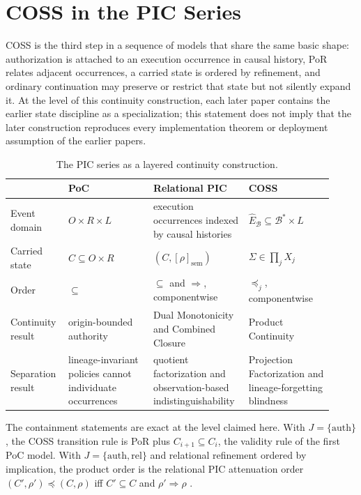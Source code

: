 \documentclass[10pt,twocolumn]{article}
\newcommand{\Model}{\textnormal{\textsc{COSS}}\xspace}
\newcommand{\state}{\Sigma}
\begin{document}
\section{COSS in the PIC Series}
\label{sec:series}

\Model is the third step in a sequence of models that share the same basic
shape: authorization is attached to an execution occurrence in causal history,
PoR relates adjacent occurrences, a carried state is ordered by refinement, and
ordinary continuation may preserve or restrict that state but not silently
expand it.  At the level of this continuity construction, each later paper
contains the earlier state discipline as a specialization; this statement does
not imply that the later construction reproduces every implementation theorem
or deployment assumption of the earlier papers.

\begin{table}[t]
\centering
\small
\begin{tabular}{@{}p{0.15\linewidth}p{0.255\linewidth}p{0.255\linewidth}p{0.255\linewidth}@{}}
\toprule
 & PoC \cite{gallo_poc2026} & Relational PIC \cite{gallo_relational2026} & \Model \\
\midrule
Event domain & $O\times R\times L$ & execution occurrences indexed by causal histories & $\widehat E_{\mathcal B}\subseteq\mathcal{B}^*\times L$ \\
Carried state & $C\subseteq O\times R$ & $(C,[\rho]_{\mathrm{sem}})$ & $\state\in\prod_j X_j$ \\
Order & $\subseteq$ & $\subseteq$ and $\Rightarrow$, componentwise & $\preceq_j$, componentwise \\
Continuity result & origin-bounded authority & Dual Monotonicity and Combined Closure & Product Continuity \\
Separation result & lineage-invariant policies cannot individuate occurrences & quotient factorization and observation-based indistinguishability & Projection Factorization and lineage-forgetting blindness \\
\bottomrule
\end{tabular}
\caption{The PIC series as a layered continuity construction.}
\label{tab:series}
\end{table}

The containment statements are exact at the level claimed here.  With
$J=\{\mathrm{auth}\}$, the \Model transition rule is PoR plus
$C_{i+1}\subseteq C_i$, the validity rule of the first PoC model.  With
$J=\{\mathrm{auth},\mathrm{rel}\}$ and relational refinement ordered by
implication, the product order is the relational PIC attenuation order
$(C',\rho')\preceq(C,\rho)$ iff $C'\subseteq C$ and
$\rho'\Rightarrow\rho$ \cite{gallo_relational2026}.
\end{document}

